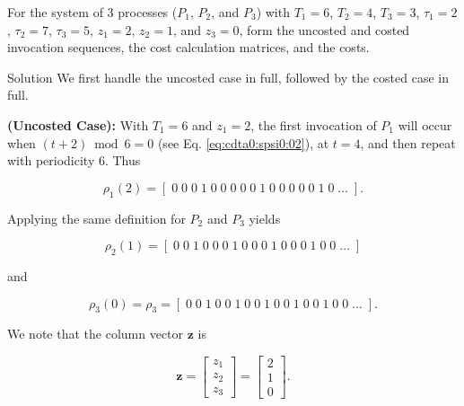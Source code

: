 \begin{vworkexamplestatement}
\label{ex:cdta0:spsi0:01}
For the system of 3 processes ($P_1$, $P_2$, and $P_3$) with 
$T_1=6$, $T_2=4$, $T_3=3$, $\tau_1=2$, $\tau_2=7$, $\tau_3=5$,
$z_1 = 2$, $z_2 = 1$, and $z_3 = 0$,
form the uncosted and costed invocation sequences, the cost
calculation matrices, and the costs.
\end{vworkexamplestatement}
\begin{vworkexampleparsection}{Solution}
We first handle the uncosted case in full, followed by the costed
case in full.

\textbf{(Uncosted Case):}
With $T_1=6$ and $z_1=2$, the first invocation of $P_1$ will occur
when $(t + 2) \bmod 6 = 0$ (see Eq. \ref{eq:cdta0:spsi0:02}), at $t=4$,
and then repeat with periodicity 6.  Thus

\begin{equation}
\label{eq:ex:cdta0:spsi0:01:01}
\rho_1(2)  =  [ \; 0 \; 0 \; 0 \; 1 \; 0 \; 0 \; 0 \; 0 \; 0 \; 1 \; 
 0 \; 0 \; 0 \; 0 \; 0 \; 1 \; 0 \; \ldots \; ] .
\end{equation}

\noindent{}Applying the same definition for $P_2$ and $P_3$ yields

\begin{equation}
\label{eq:ex:cdta0:spsi0:01:02}
\rho_2(1)  =  [ \; 0 \; 0 \; 1 \; 0 \; 0 \; 0 \; 1 \; 0 \; 0 \; 0 \; 
 1 \; 0 \; 0 \; 0 \; 1 \; 0 \; 0 \; \ldots \; ] 
\end{equation}

\noindent{}and

\begin{equation}
\label{eq:ex:cdta0:spsi0:01:03}
\rho_3(0) = \rho_3 =  [ \; 0 \; 0 \; 1 \; 0 \; 0 \; 1 \; 0 \; 0 \; 1 \; 0 \; 
 0 \; 1 \; 0 \; 0 \; 1 \; 0 \; 0 \; \ldots \; ] .
\end{equation}

We note that the column vector $\mathbf{z}$ is

\begin{equation}
\label{eq:ex:cdta0:spsi0:01:04}
\mathbf{z}
=
\left[\begin{array}{c}z_1\\z_2\\z_3\end{array}\right]
=
\left[\begin{array}{c}2\\1\\0\end{array}\right] .
\end{equation}


\end{vworkexampleparsection}
